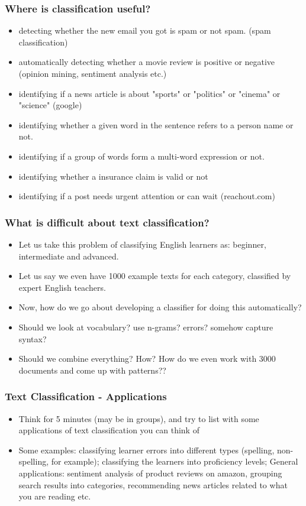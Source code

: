 \documentclass{beamer}
\begin{document}
\begin{frame}
\frametitle{Where is classification useful?}
\begin{itemize}
\item detecting whether the new email you got is spam or not spam. (spam classification)
\item automatically detecting whether a movie review is positive or negative (opinion mining, sentiment analysis etc.)
\item identifying if a news article is about "sports" or "politics" or "cinema" or "science" (google)
\item identifying whether a given word in the sentence refers to a person name or not. 
\item identifying if a group of words form a multi-word expression or not.
\item identifying whether a insurance claim is valid or not 
\item identifying if a post needs urgent attention or can wait (reachout.com)
\end{itemize}
\end{frame}

\begin{frame}
\frametitle{What is difficult about text classification?}
\begin{itemize}
\item Let us take this problem of classifying English learners as: beginner, intermediate and advanced.
\item Let us say we even have 1000 example texts for each category, classified by expert English teachers. 
\item Now, how do we go about developing a classifier for doing this automatically? \pause
\item Should we look at vocabulary? use n-grams? errors? somehow capture syntax? \pause
\item Should we combine everything? How? How do we even work with 3000 documents and come up with patterns?? 
\end{itemize}
\end{frame}

\begin{frame}
\frametitle{Text Classification - Applications}
\begin{itemize}
\item Think for 5 minutes (may be in groups), and try to list with some applications of text classification you can think of \pause
\item Some examples: classifying learner errors into different types (spelling, non-spelling, for example); classifying the learners into proficiency levels; General applications: sentiment analysis of product reviews on amazon, grouping search results into categories, recommending news articles related to what you are reading etc.
\end{itemize}
\end{frame}
\end{document}
